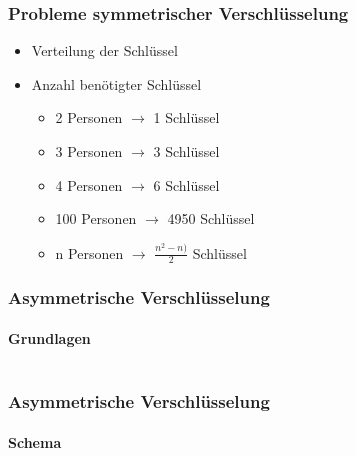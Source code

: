 \begin{frame}
  \frametitle{Probleme symmetrischer Verschlüsselung}
  \begin{itemize}
    \item Verteilung der Schlüssel
    \item Anzahl benötigter Schlüssel
    \begin{itemize}
      \item 2 Personen $\rightarrow$ 1 Schlüssel
      \item 3 Personen $\rightarrow$ 3 Schlüssel
      \pause
      \item 4 Personen $\rightarrow$ 6 Schlüssel
      \item 100 Personen $\rightarrow$ 4950 Schlüssel
      \item n Personen $\rightarrow$ $\frac{n^2-n)}{2}$ Schlüssel
    \end{itemize}
  \end{itemize}
\end{frame}

\begin{frame}
  \frametitle{Asymmetrische Verschlüsselung}
  \framesubtitle{Grundlagen}
  \begin{columns}[c]
    \begin{column}{0.5\textwidth}
      \center {}
    \end{column}
    \begin{column}{0.5\textwidth}
      \center {}
    \end{column}
  \end{columns}
\end{frame}

\begin{frame}
  \frametitle{Asymmetrische Verschlüsselung}
  \framesubtitle{Schema}
  \center {}
\end{frame}
